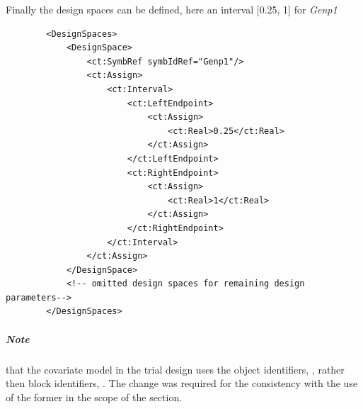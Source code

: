 Finally the design spaces can be defined, here an interval [0.25, 1] for \emph{Genp1}
\lstset{language=XML}
\begin{lstlisting}
        <DesignSpaces>
            <DesignSpace>
                <ct:SymbRef symbIdRef="Genp1"/>
                <ct:Assign>
                    <ct:Interval>
                        <ct:LeftEndpoint>
                            <ct:Assign>
                                <ct:Real>0.25</ct:Real>
                            </ct:Assign>
                        </ct:LeftEndpoint>
                        <ct:RightEndpoint>
                            <ct:Assign>
                                <ct:Real>1</ct:Real>
                            </ct:Assign>
                        </ct:RightEndpoint>
                    </ct:Interval>
                </ct:Assign>
            </DesignSpace>
            <!-- omitted design spaces for remaining design parameters-->
        </DesignSpaces>
\end{lstlisting}

\subparagraph{Note} that the covariate model in the trial design uses 
the object identifiers, , rather then block identifiers, .
The change was required for the consistency with the use of the former 
in the scope of the  section.

